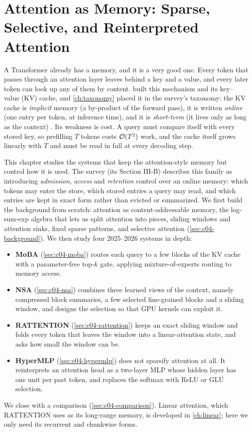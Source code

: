 \chapter{Attention as Memory: Sparse, Selective, and Reinterpreted Attention}\label{ch:sparse}

A Transformer already has a memory, and it is a very good one. Every token that passes through
an attention layer leaves behind a key and a value, and every later token can look up any of
them by content.  built this mechanism and its key--value (KV) cache, and
\cref{ch:taxonomy} placed it in the survey's taxonomy: the KV cache is \emph{implicit} memory
(a by-product of the forward pass), it is written \emph{online} (one entry per token, at
inference time), and it is \emph{short-term} (it lives only as long as the context)
\citep{zhoubian2026memory}. Its weakness is cost. A query must compare itself with every stored
key, so prefilling $T$ tokens costs $\mathcal{O}(T^2)$ work, and the cache itself grows linearly with
$T$ and must be read in full at every decoding step.

This chapter studies the systems that keep the attention-style memory but control how it is
used. The survey (its Section III-B) describes this family as introducing \emph{admission},
\emph{access} and \emph{retention} control over an online memory: which tokens may enter the
store, which stored entries a query may read, and which entries are kept in exact form rather
than evicted or summarized. We first build the background from scratch: attention as
content-addressable memory, the log-sum-exp algebra that lets us split attention into pieces,
sliding windows and attention sinks, fixed sparse patterns, and selective attention
(\cref{sec:c04-background}). We then study four 2025--2026 systems in depth:
\begin{itemize}
  \item \textbf{MoBA} (\cref{sec:c04-moba}) routes each query to a few blocks of the KV cache
  with a parameter-free top-$k$ gate, applying mixture-of-experts routing to memory access.
  \item \textbf{NSA} (\cref{sec:c04-nsa}) combines three learned views of the context, namely
  compressed block summaries, a few selected fine-grained blocks and a sliding window, and
  designs the selection so that GPU kernels can exploit it.
  \item \textbf{RATTENTION} (\cref{sec:c04-rattention}) keeps an exact sliding window and folds
  every token that leaves the window into a linear-attention state, and asks how small the
  window can be.
  \item \textbf{HyperMLP} (\cref{sec:c04-hypermlp}) does not sparsify attention at all. It
  reinterprets an attention head as a two-layer MLP whose hidden layer has one unit per past
  token, and replaces the softmax with ReLU or GLU selection.
\end{itemize}
We close with a comparison (\cref{sec:c04-comparison}). Linear attention, which RATTENTION
uses as its long-range memory, is developed in \cref{ch:linear}; here we only need its
recurrent and chunkwise forms.

